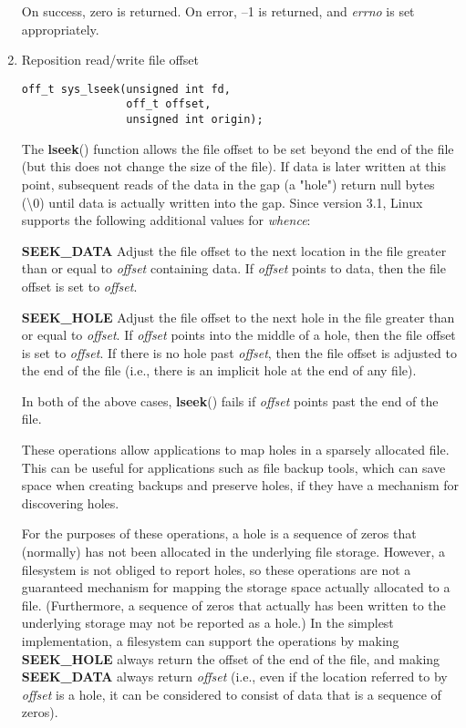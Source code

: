 \documentclass[twoside]{article}
\begin{document}
\begin{multicols}{2}
\begin{enumerate}
On success, zero is returned.
On error, --1 is returned, and
{\it errno}
is set appropriately.

\item
Reposition read/write file offset
{\footnotesize
\begin{lstlisting}
off_t sys_lseek(unsigned int fd,
                off_t offset,
                unsigned int origin);
\end{lstlisting}
\par}

The
{\bf lseek}{\rm ()}
function allows the file offset to be set beyond the end
of the file (but this does not change the size of the file).
If data is later written at this point, subsequent reads of the data
in the gap (a "hole") return null bytes (\textbackslash 0) until
data is actually written into the gap.
Since version 3.1, Linux supports the following additional values for
{\it whence}{\rm :}

\item[{{\bf SEEK\_DATA}}]
Adjust the file offset to the next location
in the file greater than or equal to
{\it offset}
containing data.
If
{\it offset}
points to data,
then the file offset is set to
{\it offset}{\rm .}
\item[{{\bf SEEK\_HOLE}}]
Adjust the file offset to the next hole in the file
greater than or equal to
{\it offset}{\rm .}
If
{\it offset}
points into the middle of a hole,
then the file offset is set to
{\it offset}{\rm .}
If there is no hole past
{\it offset}{\rm ,}
then the file offset is adjusted to the end of the file
(i.e., there is an implicit hole at the end of any file).
\par
In both of the above cases,
{\bf lseek}{\rm ()}
fails if
{\it offset}
points past the end of the file.

These operations allow applications to map holes in a sparsely
allocated file.
This can be useful for applications such as file backup tools,
which can save space when creating backups and preserve holes,
if they have a mechanism for discovering holes.

For the purposes of these operations, a hole is a sequence of zeros that
(normally) has not been allocated in the underlying file storage.
However, a filesystem is not obliged to report holes,
so these operations are not a guaranteed mechanism for
mapping the storage space actually allocated to a file.
(Furthermore, a sequence of zeros that actually has been written
to the underlying storage may not be reported as a hole.)
In the simplest implementation,
a filesystem can support the operations by making
{\bf SEEK\_HOLE}
always return the offset of the end of the file,
and making
{\bf SEEK\_DATA}
always return
{\it offset}
(i.e., even if the location referred to by
{\it offset}
is a hole,
it can be considered to consist of data that is a sequence of zeros).


\end{enumerate}
\end{multicols}
\end{document}
